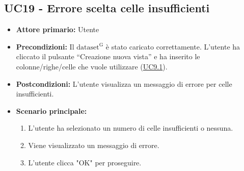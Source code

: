 \subsection{UC19 - Errore scelta celle insufficienti}
\label{sec:UC19 - Errore-celle-insufficienti}
\begin{itemize}
    \item \textbf{Attore primario:} Utente
    \item \textbf{Precondizioni:} Il ${\mathrm{dataset^{G}}}$ è stato caricato correttamente. L'utente ha cliccato il pulsante ``Creazione nuova vista'' e ha inserito le colonne/righe/celle che vuole utilizzare (\hyperref[sec:UC9.1]{UC9.1}).
    \item \textbf{Postcondizioni:} L'utente visualizza un messaggio di errore per celle insufficienti. 
    \item \textbf{Scenario principale:}
          \begin{enumerate}
              \item L'utente ha selezionato un numero di celle insufficienti o nessuna.
              \item Viene visualizzato un messaggio di errore.
              \item L'utente clicca "OK" per proseguire.
          \end{enumerate} 
\end{itemize}

